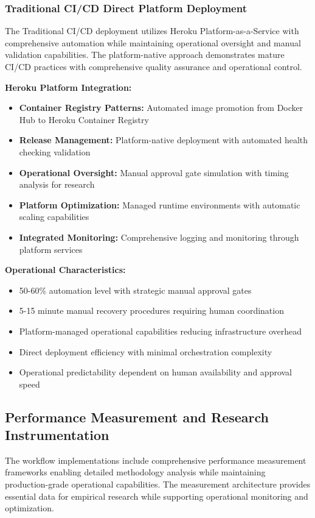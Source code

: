 \subsubsection{Traditional CI/CD Direct Platform Deployment}

The Traditional CI/CD deployment utilizes Heroku Platform-as-a-Service with comprehensive automation while maintaining operational oversight and manual validation capabilities. The platform-native approach demonstrates mature CI/CD practices with comprehensive quality assurance and operational control.

\textbf{Heroku Platform Integration:}
\begin{itemize}
\item \textbf{Container Registry Patterns:} Automated image promotion from Docker Hub to Heroku Container Registry
\item \textbf{Release Management:} Platform-native deployment with automated health checking validation
\item \textbf{Operational Oversight:} Manual approval gate simulation with timing analysis for research
\item \textbf{Platform Optimization:} Managed runtime environments with automatic scaling capabilities
\item \textbf{Integrated Monitoring:} Comprehensive logging and monitoring through platform services
\end{itemize}

\textbf{Operational Characteristics:}
\begin{itemize}
\item 50-60\% automation level with strategic manual approval gates
\item 5-15 minute manual recovery procedures requiring human coordination
\item Platform-managed operational capabilities reducing infrastructure overhead
\item Direct deployment efficiency with minimal orchestration complexity
\item Operational predictability dependent on human availability and approval speed
\end{itemize}

\subsection{Performance Measurement and Research Instrumentation}

The workflow implementations include comprehensive performance measurement frameworks enabling detailed methodology analysis while maintaining production-grade operational capabilities. The measurement architecture provides essential data for empirical research while supporting operational monitoring and optimization.

